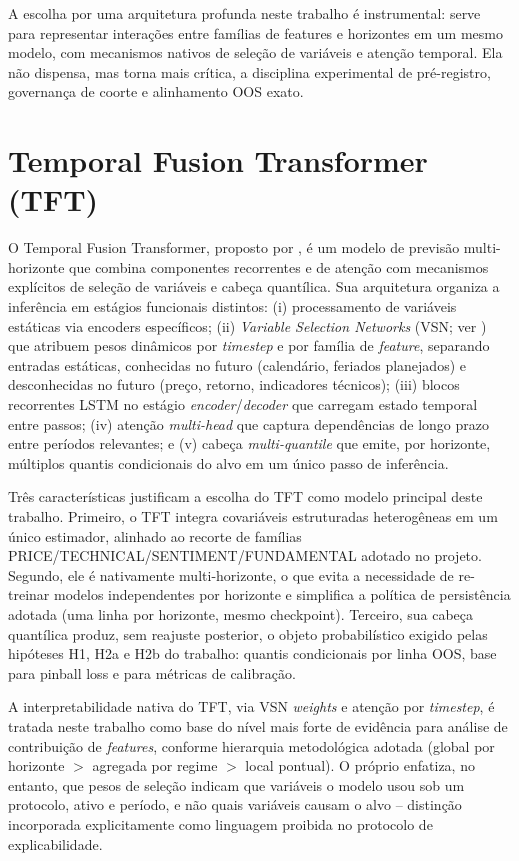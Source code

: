 A escolha por uma arquitetura profunda neste trabalho é instrumental: serve para representar interações entre famílias de features e horizontes em um mesmo modelo, com mecanismos nativos de seleção de variáveis e atenção temporal. Ela não dispensa, mas torna mais crítica, a disciplina experimental de pré-registro, governança de coorte e alinhamento OOS exato.

\section{Temporal Fusion Transformer (TFT)}
O Temporal Fusion Transformer, proposto por \cite{LIMETAL2021TFT}, é um modelo de previsão multi-horizonte que combina componentes recorrentes e de atenção com mecanismos explícitos de seleção de variáveis e cabeça quantílica. Sua arquitetura organiza a inferência em estágios funcionais distintos: (i) processamento de variáveis estáticas via encoders específicos; (ii) \textit{Variable Selection Networks} (VSN; ver ) que atribuem pesos dinâmicos por \textit{timestep} e por família de \textit{feature}, separando entradas estáticas, conhecidas no futuro (calendário, feriados planejados) e desconhecidas no futuro (preço, retorno, indicadores técnicos); (iii) blocos recorrentes LSTM no estágio \textit{encoder}/\textit{decoder} que carregam estado temporal entre passos; (iv) atenção \textit{multi-head} que captura dependências de longo prazo entre períodos relevantes; e (v) cabeça \textit{multi-quantile} que emite, por horizonte, múltiplos quantis condicionais do alvo em um único passo de inferência.

Três características justificam a escolha do TFT como modelo principal deste trabalho. Primeiro, o TFT integra covariáveis estruturadas heterogêneas em um único estimador, alinhado ao recorte de famílias PRICE/TECHNICAL/SENTIMENT/FUNDAMENTAL adotado no projeto. Segundo, ele é nativamente multi-horizonte, o que evita a necessidade de re-treinar modelos independentes por horizonte e simplifica a política de persistência adotada (uma linha por horizonte, mesmo checkpoint). Terceiro, sua cabeça quantílica produz, sem reajuste posterior, o objeto probabilístico exigido pelas hipóteses H1, H2a e H2b do trabalho: quantis condicionais por linha OOS, base para pinball loss e para métricas de calibração.

A interpretabilidade nativa do TFT, via VSN \textit{weights} e atenção por \textit{timestep}, é tratada neste trabalho como base do nível mais forte de evidência para análise de contribuição de \textit{features}, conforme hierarquia metodológica adotada (global por horizonte $>$ agregada por regime $>$ local pontual). O próprio \cite{LIMETAL2021TFT} enfatiza, no entanto, que pesos de seleção indicam que variáveis o modelo usou sob um protocolo, ativo e período, e não quais variáveis causam o alvo -- distinção incorporada explicitamente como linguagem proibida no protocolo de explicabilidade.

